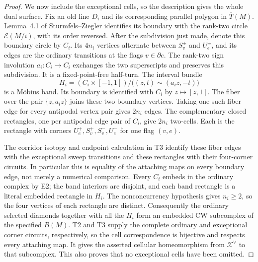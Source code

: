 \documentclass[11pt,a4paper]{article}
\begin{document}
\begin{proof}
We now include the exceptional cells, so the description gives the whole
dual surface. Fix an old line $D_i$ and its corresponding parallel
polygon in $\overline T(M)$. Lemma~4.1 of Sturmfels--Ziegler identifies
its boundary with the rank-two circle $\mathcal E(M/i)$, with its order
reversed. After the subdivision just made, denote this boundary circle
by $C_i$. Its $4n_i$ vertices alternate between $S_v^\pm$ and $U_e^\pm$,
and its edges are the ordinary transitions at the flags $v\in\partial e$.
The rank-two sign involution $a_i:C_i\to C_i$ exchanges the two superscripts
and preserves this subdivision. It is a fixed-point-free half-turn.
The interval bundle
\[
 H_i=(C_i\times[-1,1])/\bigl((z,t)\sim(a_i z,-t)\bigr)
\]
is a M\"obius band. Its boundary is identified with $C_i$ by
$z\mapsto[z,1]$. The fiber over the pair $\{z,a_i z\}$ joins these two
boundary vertices. Taking one such fiber edge for every antipodal
vertex pair gives $2n_i$ edges. The complementary closed rectangles,
one per antipodal edge pair of $C_i$, give $2n_i$ two-cells. Each is
the rectangle with corners
$U_e^+,S_v^+,S_v^-,U_e^-$ for one flag $(v,e)$.

The corridor isotopy and endpoint calculation in T3 identify these
fiber edges with the exceptional sweep transitions and these rectangles
with their four-corner circuits. In particular this is equality of
the attaching maps on every boundary edge, not merely a numerical
comparison. Every $C_i$ embeds in the ordinary complex by E2; the band
interiors are disjoint, and each band rectangle is a literal embedded
rectangle in $H_i$. The nonconcurrency hypothesis gives $n_i\geq2$, so
the four vertices of each rectangle are distinct. Consequently the
ordinary selected diamonds together with all the $H_i$ form an embedded
CW subcomplex of the specified $B(M)$. T2 and T3 supply the complete
ordinary and exceptional corner circuits, respectively, so the cell
correspondence is bijective and respects every attaching map. It gives
the asserted cellular homeomorphism from $\mathcal X^\vee$ to that
subcomplex. This also proves that no exceptional cells have been omitted.


\end{proof}
\end{document}
